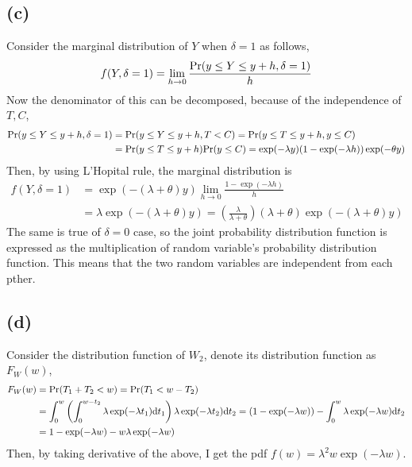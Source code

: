 \documentclass{article}
\begin{document}
\subsection{(c)}
Consider the marginal distribution of $Y$ when $\delta = 1$ as follows,
\begin{align*}
	f(Y, \delta = 1) = \lim_{h \to 0} \frac{{\rm Pr}(y \leq Y \leq y + h, \delta = 1)}{h}
\end{align*}
Now the denominator of this can be decomposed, because of the independence of $T, C$, 
\begin{align*}
	{\rm Pr}(y \leq Y \leq y + h, \delta = 1) &= {\rm Pr}(y \leq Y \leq y + h, T < C) = {\rm Pr}(y \leq T \leq y + h, y \leq C) \\
	&= {\rm Pr}(y \leq T \leq y + h) {\rm Pr}(y \leq C) = \exp(-\lambda y) (1 - \exp(-\lambda h)) \exp(-\theta y) \\
\end{align*}
Then, by using L'Hopital rule, the marginal distribution is 
\begin{align*}
	f(Y, \delta = 1) &= \exp(-(\lambda+\theta)y) \lim_{h \to 0} \frac{1 - \exp(-\lambda h)}{h}\\
	&= \lambda \exp(-(\lambda+\theta)y) = \left(\frac{\lambda}{\lambda+ \theta}\right) (\lambda+\theta)\exp(-(\lambda+\theta)y)
\end{align*}
The same is true of $\delta = 0$ case, so the joint probability distribution function is expressed as the multiplication of random variable's probability distribution function. This means that the two random variables are independent from each pther.

\subsection{(d)}
Consider the distribution function of $W_2$, denote its distribution function as $F_W(w)$,
\begin{align*}
	F_W(w) &= {\rm Pr}(T_1 + T_2 < w) = {\rm Pr}(T_1 < w - T_2)\\
	&= \int_0^w \left( \int_0^{w - t_2} \lambda \exp(-\lambda t_1) \mathrm{d}t_1 \right) \lambda \exp(-\lambda t_2) \mathrm{d}t_2
	=(1 - \exp(-\lambda w)) - \int_0^w \lambda \exp(-\lambda w) \mathrm{d}t_2 \\
	&= 1 - \exp(-\lambda w) - w \lambda \exp(-\lambda w)
\end{align*}
Then, by taking derivative of the above, I get the pdf $f(w) = \lambda^2 w \exp(-\lambda w)$.
\end{document}
